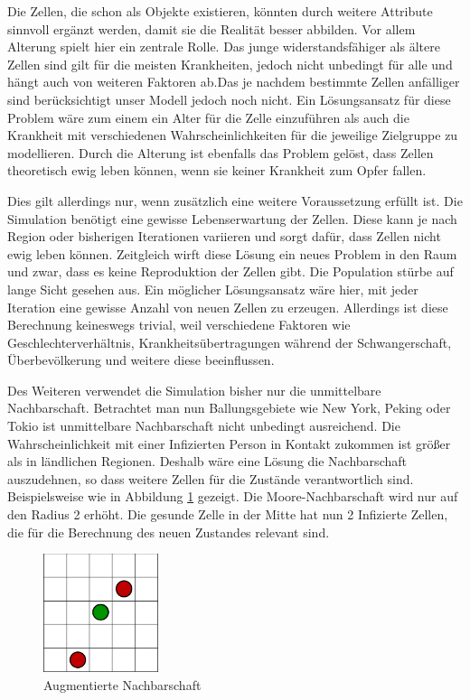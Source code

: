 \documentclass[10pt,twocolumn]{scrartcl}
\begin{document}
Die Zellen, die schon als Objekte existieren, könnten durch weitere Attribute sinnvoll ergänzt werden, damit sie die Realität besser abbilden.
Vor allem Alterung spielt hier ein zentrale Rolle. Das junge widerstandsfähiger als ältere Zellen sind gilt für die meisten Krankheiten, jedoch nicht unbedingt für alle und hängt auch von weiteren Faktoren ab.Das je nachdem bestimmte Zellen anfälliger sind berücksichtigt unser Modell jedoch noch nicht. Ein Lösungsansatz für diese Problem wäre zum einem ein Alter für die Zelle einzuführen als auch die Krankheit mit verschiedenen Wahrscheinlichkeiten für die jeweilige Zielgruppe zu modellieren. 
Durch die Alterung ist  ebenfalls das Problem gelöst, dass Zellen theoretisch ewig leben können, wenn sie keiner Krankheit zum Opfer fallen. 

Dies gilt allerdings nur, wenn zusätzlich eine weitere Voraussetzung erfüllt ist. Die Simulation benötigt eine gewisse Lebenserwartung der Zellen. Diese kann je nach Region oder bisherigen Iterationen variieren und sorgt dafür, dass Zellen nicht ewig leben können.
Zeitgleich wirft diese Lösung ein neues Problem in den Raum und zwar, dass es keine Reproduktion der Zellen gibt. Die Population stürbe auf lange Sicht gesehen aus. Ein möglicher Lösungsansatz wäre hier, mit jeder Iteration eine gewisse Anzahl von neuen Zellen zu erzeugen. Allerdings ist diese Berechnung keineswegs trivial, weil verschiedene Faktoren wie Geschlechterverhältnis, Krankheitsübertragungen während der Schwangerschaft, Überbevölkerung und weitere diese beeinflussen.

Des Weiteren verwendet die Simulation bisher nur die unmittelbare Nachbarschaft. Betrachtet man nun Ballungsgebiete wie New York, Peking oder Tokio ist unmittelbare Nachbarschaft nicht unbedingt ausreichend. Die Wahrscheinlichkeit mit einer Infizierten Person in Kontakt zukommen ist größer als in ländlichen Regionen. Deshalb wäre eine Lösung die Nachbarschaft auszudehnen, so dass weitere Zellen für die Zustände verantwortlich sind. Beispielsweise wie in Abbildung \ref{fig:ewnachbar} gezeigt. Die Moore-Nachbarschaft wird nur auf den Radius 2 erhöht. Die gesunde Zelle in der Mitte hat nun 2 Infizierte Zellen, die für die Berechnung des neuen Zustandes relevant sind. 

\begin{figure}[t]
	\centering
	\includegraphics[width= 0.3\textwidth]{./images/ewNachbar.pdf}
	\caption{Augmentierte Nachbarschaft}
	\label{fig:ewnachbar}
\end{figure}
\end{document}
